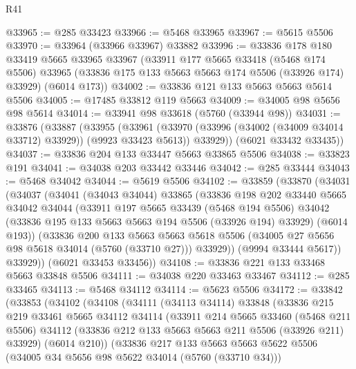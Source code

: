 \begin{lexlean}{R41}
\begin{coremodule}
@33965 := @285 @33423
@33966 := @5468 @33965
@33967 := @5615 @5506
@33970 := @33964 (@33966 @33967) @33882
@33996 := @33836
    @178
    @180
    @33419
    @5665
    @33965
    @33967
    (@33911
      @177
      @5665
      @33418
      (@5468 @174 @5506)
      @33965
      (@33836 @175 @133 @5663 @5663 @174 @5506 (@33926 @174) @33929)
      (@6014 @173))
@34002 := @33836 @121 @133 @5663 @5663 @5614 @5506
@34005 := @17485 @33812 @119 @5663
@34009 := @34005 @98 @5656 @98 @5614
@34014 := @33941 @98 @33618 (@5760 (@33944 @98))
@34031 := @33876
    (@33887
      (@33955
        (@33961
          (@33970 (@33996 (@34002 (@34009 @34014 @33712) @33929)) (@9923 @33423 @5613))
          @33929))
      (@6021 @33432 @33435))
@34037 := @33836 @204 @133 @33447 @5663 @33865 @5506
@34038 := @33823 @191
@34041 := @34038 @203 @33442 @33446
@34042 := @285 @33444
@34043 := @5468 @34042
@34044 := @5619 @5506
@34102 := @33859
    (@33870
      (@34031
        (@34037
          (@34041
            (@34043 @34044)
            @33865
            (@33836
              @198
              @202
              @33440
              @5665
              @34042
              @34044
              (@33911
                @197
                @5665
                @33439
                (@5468 @194 @5506)
                @34042
                (@33836 @195 @133 @5663 @5663 @194 @5506 (@33926 @194) @33929)
                (@6014 @193))
              (@33836
                @200
                @133
                @5663
                @5663
                @5618
                @5506
                (@34005 @27 @5656 @98 @5618 @34014 (@5760 (@33710 @27)))
                @33929))
            (@9994 @33444 @5617))
          @33929))
      (@6021 @33453 @33456))
@34108 := @33836 @221 @133 @33468 @5663 @33848 @5506
@34111 := @34038 @220 @33463 @33467
@34112 := @285 @33465
@34113 := @5468 @34112
@34114 := @5623 @5506
@34172 := @33842
    (@33853
      (@34102
        (@34108
          (@34111
            (@34113 @34114)
            @33848
            (@33836
              @215
              @219
              @33461
              @5665
              @34112
              @34114
              (@33911
                @214
                @5665
                @33460
                (@5468 @211 @5506)
                @34112
                (@33836 @212 @133 @5663 @5663 @211 @5506 (@33926 @211) @33929)
                (@6014 @210))
              (@33836
                @217
                @133
                @5663
                @5663
                @5622
                @5506
                (@34005 @34 @5656 @98 @5622 @34014 (@5760 (@33710 @34)))

\end{coremodule}
\end{lexlean}
